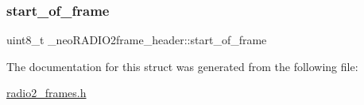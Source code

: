 \subsubsection{\texorpdfstring{start\+\_\+of\+\_\+frame}{start\_of\_frame}}
{\footnotesize\ttfamily uint8\+\_\+t \+\_\+neo\+R\+A\+D\+I\+O2frame\+\_\+header\+::start\+\_\+of\+\_\+frame}



The documentation for this struct was generated from the following file\+:\begin{DoxyCompactItemize}
\item 
\mbox{\hyperlink{radio2__frames_8h}{radio2\+\_\+frames.\+h}}\end{DoxyCompactItemize}
